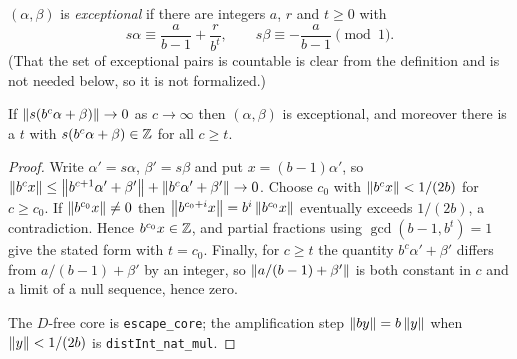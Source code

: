 \begin{definition}
  \label{def:exceptional}
  \leanok
  $(\alpha, \beta)$ is \emph{exceptional} if there are integers $a$, $r$ and
  $t \geq 0$ with
  \[
    s\alpha \equiv \frac{a}{b-1} + \frac{r}{b^t}, \qquad
    s\beta \equiv -\frac{a}{b-1} \pmod 1 .
  \]
  (That the set of exceptional pairs is countable is clear from the
  definition and is not needed below, so it is not formalized.)
\end{definition}

\begin{lemma}
  \label{lem:escape}
  \leanok
  If $\left\lVert s(b^c\alpha + \beta) \right\rVert \to 0$ as $c \to \infty$ then
  $(\alpha, \beta)$ is exceptional, and moreover there is a $t$ with
  $s(b^c\alpha + \beta) \in \mathbb{Z}$ for all $c \geq t$.
\end{lemma}
\begin{proof}
  \leanok
  Write $\alpha' = s\alpha$, $\beta' = s\beta$ and put $x = (b-1)\alpha'$, so
  $\left\lVert b^c x \right\rVert \leq \left\lVert b^{c+1}\alpha' + \beta' \right\rVert +
  \left\lVert b^c \alpha' + \beta' \right\rVert \to 0$. Choose $c_0$ with
  $\left\lVert b^c x \right\rVert < 1/(2b)$ for $c \geq c_0$. If $\left\lVert b^{c_0}x \right\rVert \neq 0$ then
  $\left\lVert b^{c_0+i}x \right\rVert = b^i\left\lVert b^{c_0}x \right\rVert$ eventually exceeds $1/(2b)$, a
  contradiction. Hence $b^{c_0}x \in \mathbb{Z}$, and partial fractions using
  $\gcd(b-1, b^t) = 1$ give the stated form with $t = c_0$.  Finally, for
  $c \geq t$ the quantity $b^c\alpha' + \beta'$ differs from
  $a/(b-1) + \beta'$ by an integer, so $\left\lVert a/(b-1) + \beta' \right\rVert$ is both
  constant in $c$ and a limit of a null sequence, hence zero.

  The $D$-free core is \texttt{escape\_core}; the amplification step
  $\left\lVert by \right\rVert = b\left\lVert y \right\rVert$ when $\left\lVert y \right\rVert < 1/(2b)$ is
  \texttt{distInt\_nat\_mul}.
\end{proof}

